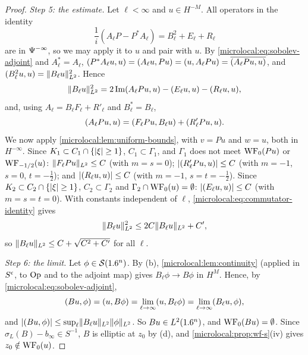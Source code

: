 \begin{proof}
  \emph{Step 5: the estimate.} Let $\ell<\infty$ and $u\in H^{-M}$. All
  operators in the identity
  \begin{equation*}
    \frac1i(A_\ell P-P^*A_\ell)=B_\ell^2+E_\ell+R_\ell
  \end{equation*}
  are in $\Psi^{-\infty}$, so we may apply it to $u$ and pair with $u$. By
  \eqref{microlocal:eq:sobolev-adjoint} and $A_\ell^*=A_\ell$,
  $( P^*A_\ell u, u)=( A_\ell u, Pu)=( u, A_\ell Pu)=\overline{( A_\ell Pu, u)}$, and
  $( B_\ell^2u, u)=\lVert B_\ell u\rVert^2_{L^2}$. Hence
  \begin{equation}\label{microlocal:eq:commutator-identity}
    \lVert B_\ell u\rVert_{L^2}^2=2\operatorname{Im}( A_\ell Pu, u)-( E_\ell u, u)-( R_\ell u, u),
  \end{equation}
  and, using $A_\ell=B_\ell F_\ell+R'_\ell$ and $B_\ell^*=B_\ell$,
  \begin{equation*}
    ( A_\ell Pu, u)=( F_\ell Pu, B_\ell u)+( R'_\ell Pu, u) .
  \end{equation*}
  We now apply \cref{microlocal:lem:uniform-bounds}, with $v=Pu$ and $w=u$,
  both in $H^{-\infty}$. Since $K_1\subset C_1\cap\{\lvert \xi\rvert\ge1\}$, $C_1\subset\Gamma_1$,
  and $\Gamma_1$ does not meet $\operatorname{WF}_0(Pu)$ or $\operatorname{WF}_{-1/2}(u)$:
  $\lVert F_\ell Pu\rVert_{L^2}\le C$ (with $m=s=0$); $\lvert ( R'_\ell Pu, u)\rvert\le C$ (with
  $m=-1$, $s=0$, $t=-\frac12$); and $\lvert ( R_\ell u, u)\rvert\le C$ (with $m=-1$,
  $s=t=-\frac12$). Since $K_2\subset C_2\cap\{\lvert \xi\rvert\ge1\}$, $C_2\subset\Gamma_2$ and
  $\Gamma_2\cap\operatorname{WF}_0(u)=\emptyset$: $\lvert ( E_\ell u, u)\rvert\le C$ (with $m=s=t=0$). With
  constants independent of $\ell$, \eqref{microlocal:eq:commutator-identity} gives
  \begin{equation*}
    \lVert B_\ell u\rVert^2_{L^2}\le2C\lVert B_\ell u\rVert_{L^2}+C',
  \end{equation*}
  so $\lVert B_\ell u\rVert_{L^2}\le C+\sqrt{C^2+C'}$ for all $\ell$.

  \emph{Step 6: the limit.} Let $\phi\in\mathcal{S}(1.6^n)$. By (b),
  \cref{microlocal:lem:continuity} (applied in $S^\epsilon$, to $\operatorname{Op}$ and to the
  adjoint map) gives $B_\ell\phi\to B\phi$ in $H^M$. Hence, by
  \eqref{microlocal:eq:sobolev-adjoint},
  \begin{equation*}
    ( Bu, \phi)=( u, B\phi)=\lim_{\ell\to\infty}( u, B_\ell\phi)
    =\lim_{\ell\to\infty}( B_\ell u, \phi),
  \end{equation*}
  and $\lvert ( Bu, \phi)\rvert\le\sup_\ell\lVert B_\ell u\rVert_{L^2}\lVert \phi\rVert_{L^2}$. So $Bu\in
  L^2(1.6^n)$, and $\operatorname{WF}_0(Bu)=\emptyset$. Since $\sigma_L(B)-b_\infty\in S^{-1}$, $B$ is
  elliptic at $z_0$ by (d), and \cref{microlocal:prop:wf-s}(iv) gives
  $z_0\notin\operatorname{WF}_0(u)$.
\end{proof}

